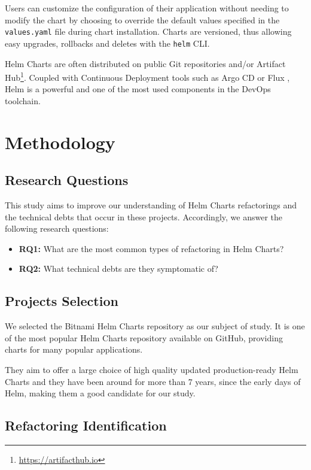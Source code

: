 \documentclass[conference]{IEEEtran}
\begin{document}
Users can customize the configuration of their application without needing to modify the chart by choosing to override the default values specified in the \texttt{values.yaml} file during chart installation. Charts are versioned, thus allowing easy upgrades, rollbacks and deletes with the \texttt{helm} CLI.

Helm Charts are often distributed on public Git repositories and/or Artifact Hub\footnote{\url{https://artifacthub.io}}. Coupled with Continuous Deployment tools such as Argo CD \cite{argocd} or Flux \cite{flux}, Helm is a powerful and one of the most used components in the DevOps toolchain.

\section{Methodology}

\subsection{Research Questions}

This study aims to improve our understanding of Helm Charts refactorings and the technical debts that occur in these projects. Accordingly, we answer the following research questions:
\begin{itemize}
    \item \textbf{RQ1:} What are the most common types of refactoring in Helm Charts?
    \item \textbf{RQ2:} What technical debts are they symptomatic of?
\end{itemize}

\subsection{Projects Selection}

We selected the Bitnami Helm Charts repository \cite{bitnami} as our subject of study. It is one of the most popular Helm Charts repository available on GitHub, providing charts for many popular applications.

They aim to offer a large choice of high quality updated production-ready Helm Charts and they have been around for more than 7 years, since the early days of Helm, making them a good candidate for our study.

\subsection{Refactoring Identification}
\end{document}
